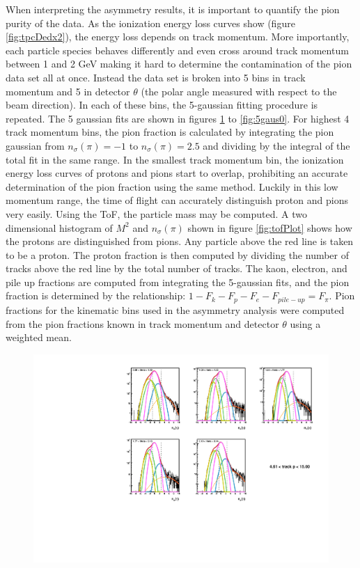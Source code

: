 \documentclass[abstract = on,listof=totoc, bibliography=totoc]{scrreprt}
\begin{document}
When interpreting the asymmetry results, it is important to quantify the pion purity of the data. As the ionization energy loss curves show (figure \ref{fig:tpcDedx2}), the energy loss depends on track momentum. More importantly, each particle species behaves differently and even cross around track momentum between 1 and 2 GeV making it hard to determine the contamination of the pion data set all at once. Instead the data set is broken into 5 bins in track momentum and 5 in detector $\theta$ (the polar angle measured with respect to the beam direction). In each of these bins, the 5-gaussian fitting procedure is repeated. The 5 gaussian fits are shown in figures \ref{fig:5gaus4} to \ref{fig:5gaus0}. For highest 4 track momentum bins, the pion fraction is calculated by integrating the pion gaussian from $n_\sigma(\pi) = -1$ to $n_\sigma(\pi) = 2.5$ and dividing by the integral of the total fit in the same range. In the smallest track momentum bin, the ionization energy loss curves of protons and pions start to overlap, prohibiting an accurate determination of the pion fraction using the same method. Luckily in this low momentum range, the time of flight can accurately distinguish proton and pions very easily. Using the ToF, the particle mass may be computed. A two dimensional histogram of $M^2$ and $n_\sigma(\pi)$ shown in figure \ref{fig:tofPlot} shows how the protons are distinguished from pions. Any particle above the red line is taken to be a proton. The proton fraction is then computed by dividing the number of tracks above the red line by the total number of tracks. The kaon, electron, and pile up fractions are computed from integrating the 5-gaussian fits, and the pion fraction is determined by the relationship: $1-F_k - F_p - F_e - F_{pile-up} = F_\pi$. Pion fractions for the kinematic bins used in the asymmetry analysis were computed from the pion fractions known in track momentum and detector $\theta$ using a weighted mean. 






 \begin{figure}
\begin{center}
\includegraphics[width = .7\textwidth]{5gausFit_pbin_4.pdf}
\caption[]{}
\label{fig:5gaus4}
\end{center}
\end{figure}
\end{document}

